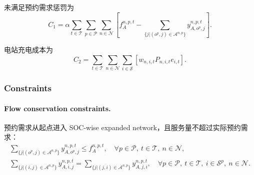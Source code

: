 \documentclass[12pt,hyperref,a4paper,UTF8]{ctexart}
\begin{document}
未满足预约需求惩罚为
\begin{equation}
C_1 = \alpha \sum_{t\in \mathcal{T}} \sum_{p\in \mathcal{P}}  \sum_{n\in \mathcal{N}} 
\left[
f^{n,p,t}_A - \sum_{\{j | (o^p,j) \in \mathcal{A}^{n,p}\}} y^{n,p,t}_{A,o^p,j} \right].
\label{eq:penaltycost}
\end{equation}

电站充电成本为
\begin{equation}
C_2 = \sum_{t \in \mathcal{T}}  \sum_{n \in \mathcal{N}} \sum_{i \in \mathcal{S}}
\left[
w_{n,i,t}P_{n,i,t}e_{i,t}
\right].
\label{eq:chargingcost}
\end{equation}

\subsubsection{Constraints}

\paragraph{Flow conservation constraints.}
预约需求从起点进入 SOC-wise expanded network，且服务量不超过实际预约需求：
\begin{subequations}
\label{eq:flow}
\begin{gather}
\sum_{\{j| (o^p,j)\in \mathcal{A}^{n,p}\}}{y^{n,p,t}_{A,o^p,j}} \leq f^{n,p,t}_A,
\quad \forall p\in \mathcal{P},\ t\in \mathcal{T},\ n \in \mathcal{N},\label{eq:flow1}\\
\sum_{\{j| (i,j)\in \mathcal{A}^{n,p}\}}{y^{n,p,t}_{A,i,j}} =
\sum_{\{j| (j,i)\in \mathcal{A}^{n,p}\}}{y^{n,p,t}_{A,j,i}},
\quad \forall p\in \mathcal{P},\ t\in \mathcal{T},\ i\in \mathcal{S}^p,\ n\in\mathcal{N}.
\label{eq:flow2}
\end{gather}
\end{subequations}
\end{document}
